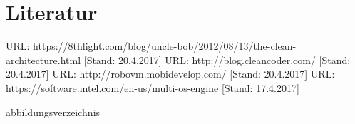 \documentclass[a4paper,10pt,xetex]{article}
\begin{document}
\section{Literatur}\label{literatur}
\begingroup
\renewcommand{\section}[2]{}%
  \begin{thebibliography}{9}
     URL: https://8thlight.com/blog/uncle-bob/2012/08/13/the-clean-architecture.html [Stand: 20.4.2017]
     URL: http://blog.cleancoder.com/ [Stand: 20.4.2017]
     URL: http://robovm.mobidevelop.com/ [Stand: 20.4.2017]
     URL: https://software.intel.com/en-us/multi-os-engine [Stand: 17.4.2017]
  \end{thebibliography}
\endgroup

\section{Abbildungsverzeichnis}\label{abbildungsverzeichnis}
\begingroup
\renewcommand{\section}[2]{}%
\hypersetup{linkcolor=black}
\listoffigures
\endgroup
\end{document}

